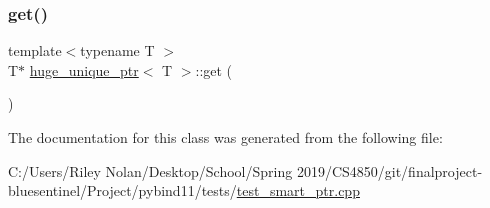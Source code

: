 \subsubsection{\texorpdfstring{get()}{get()}}
{\footnotesize\ttfamily template$<$typename T $>$ \\
T$\ast$ \mbox{\hyperlink{classhuge__unique__ptr}{huge\+\_\+unique\+\_\+ptr}}$<$ T $>$\+::get (\begin{DoxyParamCaption}{ }\end{DoxyParamCaption})\hspace{0.3cm}{\ttfamily [inline]}}



The documentation for this class was generated from the following file\+:\begin{DoxyCompactItemize}
\item 
C\+:/\+Users/\+Riley Nolan/\+Desktop/\+School/\+Spring 2019/\+C\+S4850/git/finalproject-\/bluesentinel/\+Project/pybind11/tests/\mbox{\hyperlink{test__smart__ptr_8cpp}{test\+\_\+smart\+\_\+ptr.\+cpp}}\end{DoxyCompactItemize}

